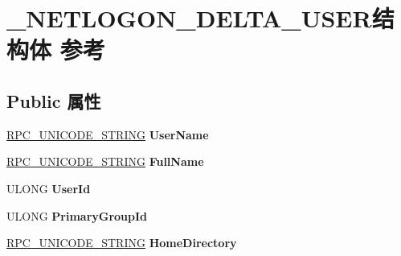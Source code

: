 \hypertarget{struct___n_e_t_l_o_g_o_n___d_e_l_t_a___u_s_e_r}{}\section{\+\_\+\+N\+E\+T\+L\+O\+G\+O\+N\+\_\+\+D\+E\+L\+T\+A\+\_\+\+U\+S\+E\+R结构体 参考}
\label{struct___n_e_t_l_o_g_o_n___d_e_l_t_a___u_s_e_r}
\subsection*{Public 属性}
\begin{DoxyCompactItemize}
\item 
\mbox{\label{struct___n_e_t_l_o_g_o_n___d_e_l_t_a___u_s_e_r_a06832a430cdbc7a7d42cd078082d4906}} 
\hyperlink{struct___r_p_c___u_n_i_c_o_d_e___s_t_r_i_n_g}{R\+P\+C\+\_\+\+U\+N\+I\+C\+O\+D\+E\+\_\+\+S\+T\+R\+I\+NG} {\bfseries User\+Name}
\item 
\mbox{\label{struct___n_e_t_l_o_g_o_n___d_e_l_t_a___u_s_e_r_ab040bbc7dfb7c90cada5715684aa62cb}} 
\hyperlink{struct___r_p_c___u_n_i_c_o_d_e___s_t_r_i_n_g}{R\+P\+C\+\_\+\+U\+N\+I\+C\+O\+D\+E\+\_\+\+S\+T\+R\+I\+NG} {\bfseries Full\+Name}
\item 
\mbox{\label{struct___n_e_t_l_o_g_o_n___d_e_l_t_a___u_s_e_r_a96be8053e59f53e557bbfff7076e9b21}} 
U\+L\+O\+NG {\bfseries User\+Id}
\item 
\mbox{\label{struct___n_e_t_l_o_g_o_n___d_e_l_t_a___u_s_e_r_a1091e3a0f72d97698e44854682d71ad1}} 
U\+L\+O\+NG {\bfseries Primary\+Group\+Id}
\item 
\mbox{\label{struct___n_e_t_l_o_g_o_n___d_e_l_t_a___u_s_e_r_a1f1f29c289e7d938734e14551f3c79d3}} 
\hyperlink{struct___r_p_c___u_n_i_c_o_d_e___s_t_r_i_n_g}{R\+P\+C\+\_\+\+U\+N\+I\+C\+O\+D\+E\+\_\+\+S\+T\+R\+I\+NG} {\bfseries Home\+Directory}
\item 
\mbox{\label{struct___n_e_t_l_o_g_o_n___d_e_l_t_a___u_s_e_r_a318359a72380652614e770bab0cba744}} 

\end{DoxyCompactItemize}
